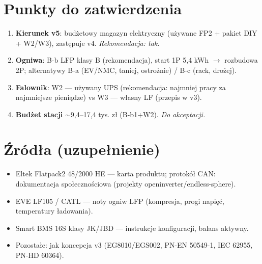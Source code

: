 \documentclass[11pt,a4paper]{article}
\begin{document}
\section{Punkty do zatwierdzenia}
\begin{enumerate}[label=\textbf{Z\arabic*.},start=16]
\item \textbf{Kierunek v5}: budżetowy magazyn elektryczny (używane FP2 + pakiet DIY + W2/W3),
zastępuje v4. \emph{Rekomendacja: tak.}
\item \textbf{Ogniwa}: B-b LFP klasy B (rekomendacja), start 1P 5,4 kWh $\to$ rozbudowa 2P;
alternatywy B-a (EV/NMC, taniej, ostrożnie) / B-c (rack, drożej).
\item \textbf{Falownik}: W2 --- używany UPS (rekomendacja: najmniej pracy za najmniejsze
pieniądze) vs W3 --- własny LF (przepis w v3).
\item \textbf{Budżet stacji} $\sim$9,4--17,4 tys. zł (B-b1+W2). \emph{Do akceptacji.}
\end{enumerate}

\section{Źródła (uzupełnienie)}
\begin{itemize}\small
\item Eltek Flatpack2 48/2000 HE --- karta produktu; protokół CAN: dokumentacja społecznościowa
(projekty openinverter/endless-sphere).
\item EVE LF105 / CATL --- noty ogniw LFP (kompresja, progi napięć, temperatury ładowania).
\item Smart BMS 16S klasy JK/JBD --- instrukcje konfiguracji, balans aktywny.
\item Pozostałe: jak koncepcja v3 (EG8010/EGS002, PN-EN 50549-1, IEC 62955, PN-HD 60364).
\end{itemize}
\end{document}
